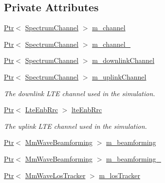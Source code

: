 \subsection*{Private Attributes}
\begin{DoxyCompactItemize}
\item 
\hyperlink{classns3_1_1Ptr}{Ptr}$<$ \hyperlink{classns3_1_1SpectrumChannel}{Spectrum\+Channel} $>$ \hyperlink{classns3_1_1MmWaveHelper_adac6d83bc2acef8b7dbd9fc668207d95}{m\+\_\+channel}
\item 
\hyperlink{classns3_1_1Ptr}{Ptr}$<$ \hyperlink{classns3_1_1SpectrumChannel}{Spectrum\+Channel} $>$ \hyperlink{classns3_1_1MmWaveHelper_af0230ef91f1c4defe2a316f5de3ff209}{m\+\_\+channel\+\_}
\item 
\hyperlink{classns3_1_1Ptr}{Ptr}$<$ \hyperlink{classns3_1_1SpectrumChannel}{Spectrum\+Channel} $>$ \hyperlink{classns3_1_1MmWaveHelper_aa8d0ffe634d74e461d22d96afcec0239}{m\+\_\+downlink\+Channel}
\item 
\hyperlink{classns3_1_1Ptr}{Ptr}$<$ \hyperlink{classns3_1_1SpectrumChannel}{Spectrum\+Channel} $>$ \hyperlink{classns3_1_1MmWaveHelper_a4f2b3aa855c0324fadfd5b174e240a66}{m\+\_\+uplink\+Channel}
\begin{DoxyCompactList}\small\item\em The downlink L\+TE channel used in the simulation. \end{DoxyCompactList}\item 
\hyperlink{classns3_1_1Ptr}{Ptr}$<$ \hyperlink{classns3_1_1LteEnbRrc}{Lte\+Enb\+Rrc} $>$ \hyperlink{classns3_1_1MmWaveHelper_a877dec693e5e6669a413ef40e6f7f873}{lte\+Enb\+Rrc}
\begin{DoxyCompactList}\small\item\em The uplink L\+TE channel used in the simulation. \end{DoxyCompactList}\item 
\hyperlink{classns3_1_1Ptr}{Ptr}$<$ \hyperlink{classns3_1_1MmWaveBeamforming}{Mm\+Wave\+Beamforming} $>$ \hyperlink{classns3_1_1MmWaveHelper_a4fa071b6d755f32a684906150660b381}{m\+\_\+beamforming}
\item 
\hyperlink{classns3_1_1Ptr}{Ptr}$<$ \hyperlink{classns3_1_1MmWaveBeamforming}{Mm\+Wave\+Beamforming} $>$ \hyperlink{classns3_1_1MmWaveHelper_a3406a28781481686589a5275787bf43f}{m\+\_\+beamforming\+\_}
\item 
\hyperlink{classns3_1_1Ptr}{Ptr}$<$ \hyperlink{classns3_1_1MmWaveLosTracker}{Mm\+Wave\+Los\+Tracker} $>$ \hyperlink{classns3_1_1MmWaveHelper_af8d5d3767371b17c144a0bea7e92af44}{m\+\_\+los\+Tracker}

\end{DoxyCompactItemize}
